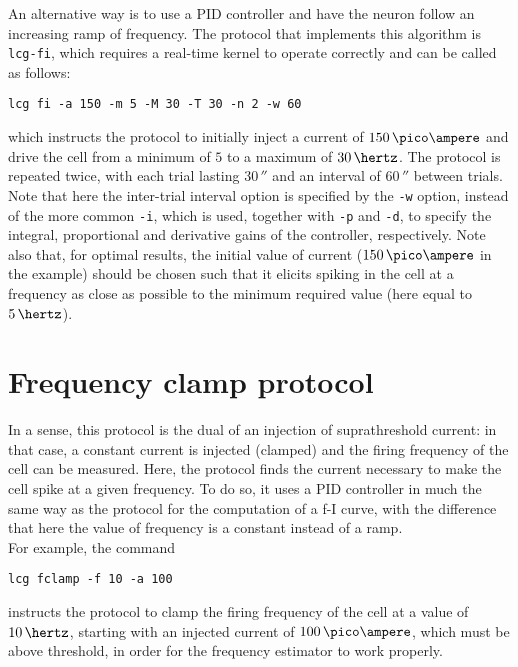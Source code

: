 An alternative way is to use a PID
controller and have the neuron follow an increasing ramp of
frequency. The protocol that implements this algorithm is
\verb+lcg-fi+, which requires a real-time kernel to operate correctly
and can be called as follows:
\begin{lstlisting}
lcg fi -a 150 -m 5 -M 30 -T 30 -n 2 -w 60
\end{lstlisting}
which instructs the protocol to initially inject a current of
$150\,\pico\ampere$ and drive the cell from a minimum of $5$ to a
maximum of $30\,\hertz$. The protocol is repeated twice, with each
trial lasting $30\,\second$ and an interval of $60\,\second$ between
trials. Note that here the inter-trial interval option is specified by
the \verb+-w+ option, instead of the more common \verb+-i+, which is
used, together with \verb+-p+ and \verb+-d+, to specify the integral,
proportional and derivative gains of the controller,
respectively. Note also that, for optimal results, the initial value
of current ($150\,\pico\ampere$ in the example) should be chosen such
that it elicits spiking in the cell at a frequency as close as
possible to the minimum required value (here equal to $5\,\hertz$).

\section{Frequency clamp protocol}
In a sense, this protocol is the dual of an injection of
suprathreshold current: in that case, a constant current is injected
(clamped) and the firing frequency of the cell can be measured. Here,
the protocol finds the current necessary to make the cell spike at a
given frequency. To do so, it uses a PID controller in much the same
way as the protocol for the computation of a f-I curve, with the
difference that here the value of frequency is a constant instead of a
ramp.\\
For example, the command
\begin{lstlisting}
lcg fclamp -f 10 -a 100
\end{lstlisting}
instructs the protocol to clamp the firing frequency of the cell at a
value of $10\,\hertz$, starting with an injected current of
$100\,\pico\ampere$, which must be above threshold, in order for the
frequency estimator to work properly.

